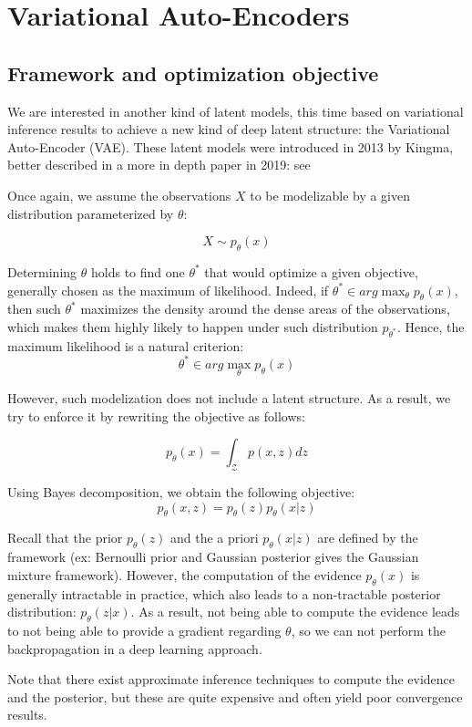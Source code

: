 \section{Variational Auto-Encoders}

\subsection{Framework and optimization objective}

We are interested in another kind of latent models, this time based on variational inference
results to achieve a new kind of deep latent structure: the Variational Auto-Encoder (VAE).
These latent models were introduced in 2013 by Kingma, better described in a more in depth paper in 2019: see \cite{kingma2019introduction}

Once again, we assume the observations $X$ to be modelizable by a given distribution
parameterized by $\theta$:

$$
X \sim p_{\theta}(x)
$$

Determining $\theta$ holds to find one $\theta^*$ that would optimize a given objective, generally chosen as the maximum of likelihood. Indeed, if $\theta^* \in arg\max_{\theta} p_{\theta}(x)$, then such $\theta^*$ maximizes the density around the dense areas of the observations, which makes them highly likely to happen under such distribution $p_{\theta^*}$. Hence, the maximum likelihood is a natural criterion:
$$
\theta^* \in arg\max_{\theta} p_{\theta}(x)
$$

However, such modelization does not include a latent structure.
As a result, we try to enforce it by rewriting the objective as follows:

$$
p_{\theta}(x) = \int_{\mathcal{Z}} p(x,z) dz 
$$

Using Bayes decomposition, we obtain the following objective:
$$
p_{\theta}(x,z) = p_{\theta}(z) p_{\theta}(x|z)
$$

Recall that the prior $p_{\theta}(z)$ and the a priori $p_{\theta}(x|z)$ are defined by the framework (ex: Bernoulli prior and Gaussian posterior gives the Gaussian mixture framework). However, the computation of the evidence $p_{\theta}(x)$ is generally intractable in practice, which also leads to a non-tractable posterior distribution: $p_{\theta}(z|x)$. As a result, not being able to compute the evidence leads to not being able to provide a gradient regarding $\theta$, so we can not perform the backpropagation in a deep learning approach.

Note that there exist approximate inference techniques to compute the evidence and the
posterior, but these are quite expensive and often yield poor convergence results.

